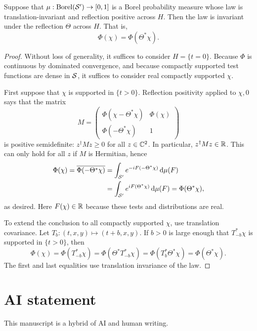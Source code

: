 \begin{proposition}\label{prop:refl}
Suppose that $\mu:\operatorname{Borel}(\mathcal{S}')\to[0,1]$ is a Borel
probability measure whose law is translation-invariant and reflection
positive across $H$. Then the law is invariant under the reflection
$\Theta$ across $H$. That is,
\begin{equation}
 \Phi(\chi)=\Phi(\Theta^*\chi).
\end{equation}
\end{proposition}
\begin{proof}
Without loss of generality, it suffices to consider $H=\{t=0\}$.
Because $\Phi$ is continuous by dominated convergence, and because
compactly supported test functions are dense in $\mathcal{S}$, it suffices
to consider real compactly supported $\chi$.

First suppose that $\chi$ is supported in $\{t>0\}$. Reflection
positivity applied to $\chi,0$ says that the matrix
\begin{equation}
 M=\begin{pmatrix}
 \Phi(\chi-\Theta^*\chi)&\Phi(\chi)\\
 \Phi(-\Theta^*\chi)&1
 \end{pmatrix}
\end{equation}
is positive semidefinite: $z^\dagger Mz\geq0$ for all $z\in\mathbb{C}^2$.
In particular, $z^\dagger Mz\in\mathbb{R}$. This can only hold for all $z$
if $M$ is Hermitian, hence
\begin{align*}
 \Phi(\chi)=\overline{\Phi(-\Theta^*\chi)}
 &=\int_{\mathcal{S}'}e^{-iF(-\Theta^*\chi)}\,\mathrm{d}\mu(F)\\
 &=\int_{\mathcal{S}'}e^{iF(\Theta^*\chi)}\,\mathrm{d}\mu(F)
 =\Phi(\Theta^*\chi),
\end{align*}
as desired. Here $F(\chi)\in\mathbb{R}$ because these tests and
distributions are real.

To extend the conclusion to all compactly supported $\chi$, use
translation covariance. Let $T_b:(t,x,y)\mapsto(t+b,x,y)$. If $b>0$
is large enough that $T_{-b}^*\chi$ is supported in $\{t>0\}$, then
\begin{equation}
 \Phi(\chi)=\Phi(T_{-b}^*\chi)
 =\Phi(\Theta^*T_{-b}^*\chi)
 =\Phi(T_b^*\Theta^*\chi)=\Phi(\Theta^*\chi).
\end{equation}
The first and last equalities use translation invariance of the law.
\end{proof}

\section*{AI statement}

This manuscript is a hybrid of AI and human writing.

\printbibliography


